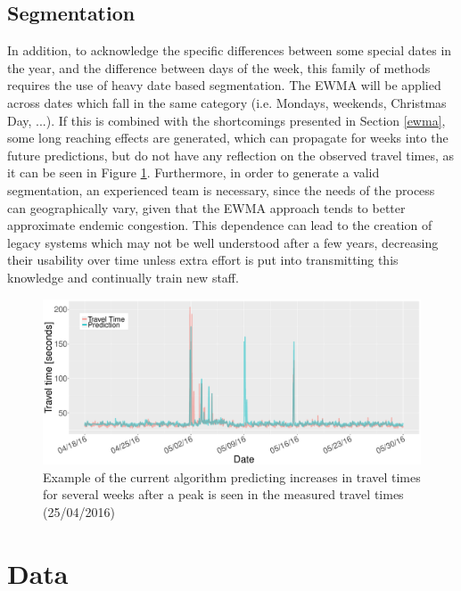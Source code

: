 \documentclass[conference, letterpaper]{IEEEtran}
\begin{document}
\subsection{Segmentation}\label{segmentation}
In addition, to acknowledge the specific differences between some special dates in the year, and the difference between days of the week, this family of methods requires the use of heavy date based segmentation. 
The EWMA will be applied across dates which fall in the same category (i.e. Mondays, weekends, Christmas Day, ...).
If this is combined with the shortcomings presented in Section \ref{ewma}, some long reaching effects are generated, which can propagate for weeks into the future predictions, but do not have any reflection on the observed travel times, as it can be seen in Figure \ref{fig:EWMA_spike}.
Furthermore, in order to generate a valid segmentation, an experienced team is necessary, since the needs of the process can geographically vary, given that the EWMA approach tends to better approximate endemic congestion. 
This dependence can lead to the creation of legacy systems which may not be well understood after a few years, decreasing their usability over time unless extra effort is put into transmitting this knowledge and continually train new staff.
\begin{figure}
	\includegraphics[width=\linewidth]{EWMA.pdf}
	\caption{Example of the current algorithm predicting increases in travel times for several weeks after a peak is seen in the measured travel times (25/04/2016)}
	\label{fig:EWMA_spike}
\end{figure}
\section{Data}
\end{document}
